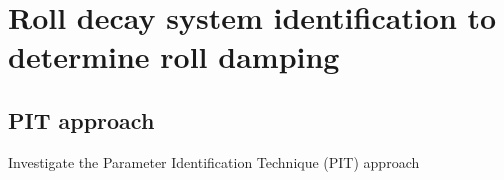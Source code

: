 \section{Roll decay system identification to determine roll damping}
\subsection{PIT approach}
Investigate the Parameter Identification Technique (PIT) approach \cite{soder_assessment_2019}